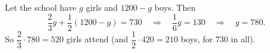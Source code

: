 Let the school have $g$ girls and $1200-g$ boys. Then
\[
\dfrac{2}{3}g+\dfrac{1}{2}(1200-g)=730\quad\Longrightarrow\quad\dfrac{1}{6}g=130\quad\Longrightarrow\quad g=780 .
\]
So $\dfrac{2}{3}\cdot780=\boxed{520}$ girls attend (and $\dfrac{1}{2}\cdot420=210$ boys, for $730$ in all).

